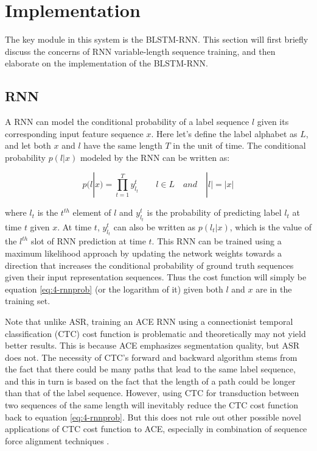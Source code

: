 \section{Implementation}\label{sec:4-blstm}
The key module in this system is the BLSTM-RNN. This section will first briefly discuss the concerns of RNN variable-length sequence training, and then elaborate on the implementation of the BLSTM-RNN.

\subsection{RNN}
A RNN can model the conditional probability of a label sequence $l$ given its corresponding input feature sequence $x$. Here let's define the label alphabet as $L$, and let both $x$ and $l$ have the same length $T$ in the unit of time. The conditional probability $p(l|x)$ modeled by the RNN can be written as:

\begin{equation}\label{eq:4-rnnprob}
p(l|x) = \prod_{t=1}^T y_{l_t}^t  \quad\quad l\in L \quad and \quad |l| = |x|
\end{equation}

where $l_t$ is the $t^{th}$ element of $l$ and $y_{l_t}^t$ is the probability of predicting label $l_t$ at time $t$ given $x$. At time $t$, $y_{l_t}^t$ can also be written as $p(l_t|x)$, which is the value of the $l^{th}$ slot of RNN prediction at time $t$. This RNN can be trained using a maximum likelihood approach by updating the network weights towards a direction that increases the conditional probability of ground truth sequences given their input representation sequences. Thus the cost function will simply be equation \ref{eq:4-rnnprob} (or the logarithm of it) given both $l$ and $x$ are in the training set.

Note that unlike ASR, training an ACE RNN using a connectionist temporal classification (CTC) cost function \cite{graves2006connectionist} is problematic and theoretically may not yield better results. This is because ACE emphasizes segmentation quality, but ASR does not. The necessity of CTC's forward and backward algorithm stems from the fact that there could be many paths that lead to the same label sequence, and this in turn is based on the fact that the length of a path could be longer than that of the label sequence. However, using CTC for transduction between two sequences of the same length will inevitably reduce the CTC cost function back to equation \ref{eq:4-rnnprob}. But this does not rule out other possible novel applications of CTC cost function to ACE, especially in combination of sequence force alignment techniques \cite{sheh2003chord,mauch2010lyrics}.

